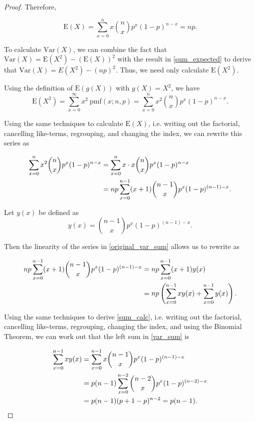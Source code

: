 \documentclass[12pt]{article}
\theoremstyle{definition}
\newcommand{\E}{\text{E}}
\newcommand{\V}{\text{Var}}
\newcommand{\pmf}{\text{pmf}}
\begin{document}
\begin{proof}
  Therefore,

  \begin{equation}\label{sum_expected}
    \E(X) = \sum_{x=0}^{n} x {n \choose x} p^x (1-p)^{n-x} = np.
  \end{equation}

  To calculate $\V(X)$, we can combine the fact that $\V(X) = \E(X^2) - (\E(X))^2$
  with the result in \eqref{sum_expected} to derive that
  $\V(X) = E(X^2) - (np)^2$. Thus, we need only calculate $\E(X^2)$.

  Using the definition of $\E(g(X))$ with $g(X) = X^2$, we have
  \[
    \E(X^2) = \sum_{x=0}^{\infty} x^2\ \pmf(x; n, p) = \sum_{x=0}^{n} x^2 {n \choose x} p^x (1-p)^{n-x}.
  \]

  Using the same techniques to calculate $\E(X)$, i.e. writing out the factorial,
  cancelling like-terms, regrouping, and changing the index, we can rewrite
  this series as

  \begin{align}\label{original_var_sum}
    \sum_{x=0}^{n} x^2 {n \choose x} p^x (1-p)^{n-x}
    &= \sum_{x=0}^{n} x \cdot x {n \choose x} p^x (1-p)^{n-x} \notag \\
    &= np \sum_{x=0}^{n - 1} (x + 1) {n - 1 \choose x} p^x (1-p)^{(n-1)-x}.
  \end{align}

  Let $y(x)$ be defined as
  \[
    y(x) = {n - 1 \choose x} p^x (1-p)^{(n-1)-x}.
  \]

  Then the linearity of the series in \eqref{original_var_sum} allows us to rewrite as

  \begin{align}
    np \sum_{x=0}^{n - 1} (x + 1) {n - 1 \choose x} p^x (1-p)^{(n-1)-x}
    &= np \sum_{x=0}^{n - 1} (x + 1) y(x) \notag \\
    &= np \left( \sum_{x=0}^{n - 1} x y(x) + \sum_{x=0}^{n - 1} y(x) \right). \label{var_sum}
  \end{align}

  Using the same techniques to derive \eqref{sum_calc}, i.e. writing out the factorial,
  cancelling like-terms, regrouping, changing the index, and using the
  Binomial Theorem, we can work out that the left sum in \eqref{var_sum} is

  \begin{align}
    \sum_{x=0}^{n - 1} x y(x)
    &= \sum_{x=0}^{n - 1} x {n - 1 \choose x} p^x (1-p)^{(n-1)-x} \notag \\
    &= p(n-1) \sum_{x=0}^{n - 2} {n - 2 \choose x} p^x (1-p)^{(n-2)-x} \notag \\
    &= p(n-1)(p + 1 -p)^{n-2} = p(n-1). \label{var_calc_left_sum}
  \end{align}


\end{proof}
\end{document}
